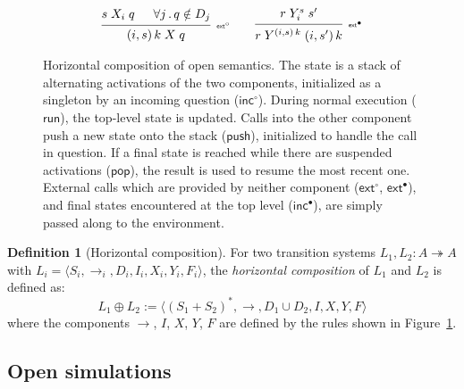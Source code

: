 \documentclass[11pt,oneside]{book}
\theoremstyle{definition}
\newtheorem{definition}[theorem]{Definition}
\newcommand{\kw}[1]{\ensuremath{ \mathsf{#1} }}
\newcommand{\que}{\circ}         %
\newcommand{\ans}{\bullet}       %
\begin{document}
\begin{figure}
\[\begin{array}{c}
      \\
     {\begin{prooftree}
        \hypo{s \mathrel{X_i} q}
        \hypo{\forall j \,.\, q \notin D_j}
        \infer2[\tiny $\kw{ext}^\que$]{(i, s) \, k \mathrel{X} q}
      \end{prooftree}}
      \qquad
     {\begin{prooftree}
        \hypo{r \mathrel{Y_i^s} s'}
        \infer1[\tiny $\kw{ext}^\ans$]{
          r \mathrel{Y^{(i, s) \, k}} (i, s') \, k}
      \end{prooftree}}
    \end{array}
  \]
    \caption[Horizontal composition of open semantics]%
     {Horizontal composition of open semantics.
      The state is a stack of alternating activations
      of the two components,
      initialized as a singleton by an incoming question ($\kw{inc}^\que$).
      During normal execution ($\kw{run}$),
      the top-level state is updated.
      Calls into the other component
      push a new state onto the stack ($\kw{push}$),
      initialized to handle the call in question.
      If a final state is reached
      while there are suspended activations ($\kw{pop}$),
      the result is used to resume the most recent one.
      External calls which are provided by neither component
      ($\kw{ext}^\que$, $\kw{ext}^\ans$),
      and final states encountered at the top level
      ($\kw{inc}^\ans$),
      are simply passed along to the environment.
    }
    \label{fig:hcomp}
\end{figure}

\begin{definition}[Horizontal composition] \label{def:hcomp} %
For two transition systems $L_1, L_2 : A \twoheadrightarrow A$
with
$L_i = \langle S_i, {\rightarrow}_i, D_i, I_i, X_i, Y_i, F_i \rangle$,
the \emph{horizontal composition} of $L_1$ and $L_2$
is defined as:
\[
    L_1 \oplus L_2 :=
    \langle
      (S_1 + S_2)^*, {\rightarrow}, D_1 \cup D_2, I, X, Y, F
    \rangle
\]
where the components $\rightarrow$, $I$, $X$, $Y$, $F$
are defined by
the rules shown in Figure~\ref{fig:hcomp}.
\end{definition}



\subsection{Open simulations} \label{sec:sem:ref} %
\end{document}
